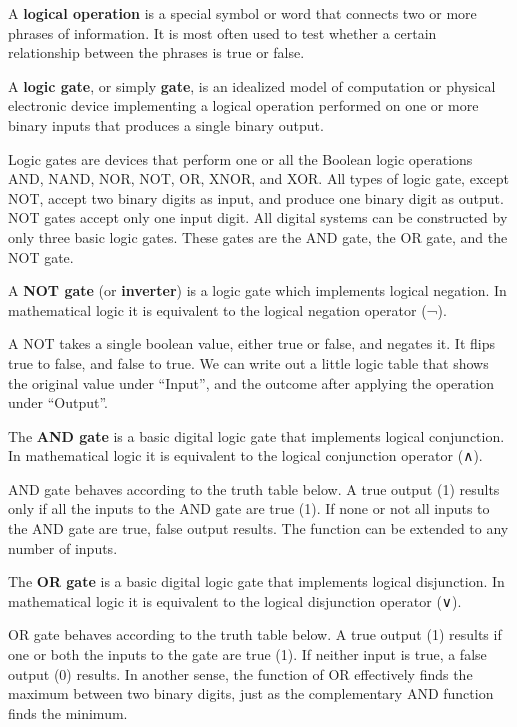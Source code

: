 A \textbf{logical operation} is a special symbol or word that connects two or more phrases of information. It is most
often used to test whether a certain relationship between the phrases is true or false.
\ed

A \textbf{logic gate}, or simply \textbf{gate}, is an idealized model of computation or physical electronic device
implementing a logical operation performed on one or more binary inputs that produces a single binary output.
\ed

Logic gates are devices that perform one or all the Boolean logic operations AND, NAND, NOR, NOT, OR, XNOR, and XOR\@.
All types of logic gate, except NOT, accept two binary digits as input, and produce one binary digit as output. NOT
gates accept only one input digit. All digital systems can be constructed by only three basic logic gates. These gates
are the AND gate, the OR gate, and the NOT gate.

A \textbf{NOT gate} (or \textbf{inverter}) is a logic gate which implements logical negation. In mathematical logic
it is equivalent to the logical negation operator (¬).
\ed

A NOT takes a single boolean value, either true or false, and negates it. It flips true to false, and false to true.
We can write out a little logic table that shows the original value under ``Input'', and the outcome after applying the
operation under ``Output''.


The \textbf{AND gate} is a basic digital logic gate that implements logical conjunction. In mathematical logic it is
equivalent to the logical conjunction operator (∧).
\ed

AND gate behaves according to the truth table below. A true output (1) results only if all the inputs to the AND gate
are true (1). If none or not all inputs to the AND gate are true, false output results. The function can be extended
to any number of inputs.


\vspace{-15pt}

\bd[OR Gate]
The \textbf{OR gate} is a basic digital logic gate that implements logical disjunction. In mathematical logic it is
equivalent to the logical disjunction operator (∨).
\ed

OR gate behaves according to the truth table below. A true output (1) results if one or both the inputs to the gate
are true (1). If neither input is true, a false output (0) results. In another sense, the function of OR effectively
finds the maximum between two binary digits, just as the complementary AND function finds the minimum.

